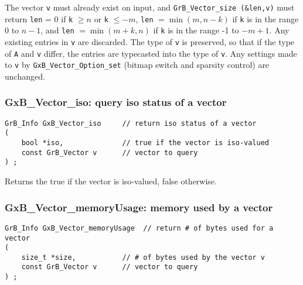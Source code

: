 \documentclass[12pt]{article}
\begin{document}
The vector \verb'v' must already exist on input, and
\verb'GrB_Vector_size (&len,v)' must return \verb'len' = 0 if \verb'k' $\ge n$
or \verb'k' $\le -m$, \verb'len' $=\min(m,n-k)$ if \verb'k' is in the range 0
to $n-1$, and \verb'len' $=\min(m+k,n)$ if \verb'k' is in the range -1 to
$-m+1$.  Any existing entries in \verb'v' are discarded.  The type of \verb'v'
is preserved, so that if the type of \verb'A' and \verb'v' differ, the entries
are typecasted into the type of \verb'v'.  Any settings made to \verb'v' by
\verb'GxB_Vector_Option_set' (bitmap switch and sparsity control) are
unchanged.

\subsubsection{{\sf GxB\_Vector\_iso:} query iso status of a vector}
\label{vector_iso}

\begin{mdframed}[userdefinedwidth=6in]
{\footnotesize
\begin{verbatim}
GrB_Info GxB_Vector_iso     // return iso status of a vector
(
    bool *iso,              // true if the vector is iso-valued
    const GrB_Vector v      // vector to query
) ;
\end{verbatim} } \end{mdframed}

Returns the true if the vector is iso-valued, false otherwise.

\subsubsection{{\sf GxB\_Vector\_memoryUsage:} memory used by a vector}
\label{vector_memusage}

\begin{mdframed}[userdefinedwidth=6in]
{\footnotesize
\begin{verbatim}
GrB_Info GxB_Vector_memoryUsage  // return # of bytes used for a vector
(
    size_t *size,           // # of bytes used by the vector v
    const GrB_Vector v      // vector to query
) ;
\end{verbatim} } \end{mdframed}
\end{document}
